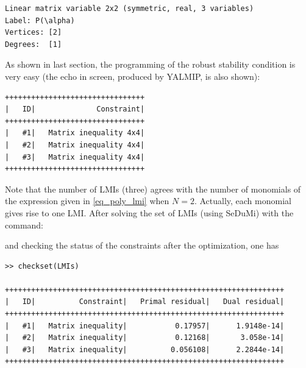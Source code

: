 \documentclass[english,11pt]{article}
\theoremstyle{break} \theorembodyfont{\small\rm}
\begin{document}
\begin{minipage}{13.5cm}
\begin{lstlisting}[rulecolor=\color{red}]
Linear matrix variable 2x2 (symmetric, real, 3 variables)
Label: P(\alpha)
Vertices: [2]
Degrees:  [1]
\end{lstlisting}
\end{minipage}

As shown in last section, the programming of the robust stability condition is very easy (the echo in screen, produced by YALMIP, is also shown):

\vspace{0.5cm}
\begin{minipage}{20.5cm}
\end{minipage}

\begin{minipage}{9.2cm}
\begin{lstlisting}[rulecolor=\color{red}]
++++++++++++++++++++++++++++++++
|   ID|              Constraint|
++++++++++++++++++++++++++++++++
|   #1|   Matrix inequality 4x4|
|   #2|   Matrix inequality 4x4|
|   #3|   Matrix inequality 4x4|
++++++++++++++++++++++++++++++++
\end{lstlisting}
\end{minipage}


Note that the number of LMIs (three) agrees with the number of monomials  of the expression given in \eqref{eq_poly_lmi} when $N=2$. Actually, each monomial gives rise to one LMI. After solving the set of LMIs (using SeDuMi) with the command:

\vspace{0.5cm}
\begin{minipage}{20.5cm}
\end{minipage}
\vspace{0.2cm}

\noindent and checking the status of the constraints after the optimization, one has

\begin{minipage}{15.0cm}
\begin{lstlisting}[rulecolor=\color{red}]
>> checkset(LMIs)

++++++++++++++++++++++++++++++++++++++++++++++++++++++++++++++++
|   ID|          Constraint|   Primal residual|   Dual residual|
++++++++++++++++++++++++++++++++++++++++++++++++++++++++++++++++
|   #1|   Matrix inequality|           0.17957|      1.9148e-14|
|   #2|   Matrix inequality|           0.12168|       3.058e-14|
|   #3|   Matrix inequality|          0.056108|      2.2844e-14|
++++++++++++++++++++++++++++++++++++++++++++++++++++++++++++++++
\end{lstlisting}
\end{minipage}
\end{document}
